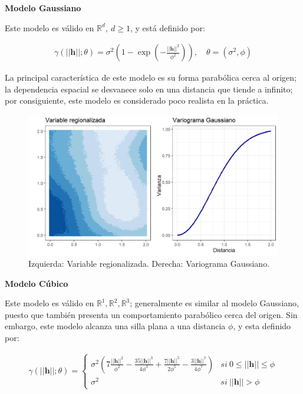\documentclass[
]{book}
\begin{document}
\textbf{Modelo Gaussiano}

Este modelo es válido en \(\mathbb{R}^d,\ d\geq 1\), y está definido por:

\begin{align}
    \gamma(||\textbf{h}||;\theta)=\sigma^2\left(1-\exp\left(-\frac{||\textbf{h}||^2}{\phi^2} \right) \right),\quad \theta=(\sigma^2,\phi)
\end{align}

La principal característica de este modelo es su forma parabólica cerca al origen; la dependencia espacial se desvanece solo en una distancia que tiende a infinito; por consiguiente, este modelo es considerado poco realista en la práctica.

\begin{figure}
\includegraphics[width=17.78in]{figuras/otros/gau_var} \caption{Izquierda: Variable regionalizada. Derecha: Variograma Gaussiano.}\label{fig:gauvar}
\end{figure}

\textbf{Modelo Cúbico}

Este modelo es válido en \(\mathbb{R}^1,\mathbb{R}^2,\mathbb{R}^3\); generalmente es similar al modelo Gaussiano, puesto que también presenta un comportamiento parabólico cerca del origen. Sin embargo, este modelo alcanza una silla plana a una distancia \(\phi\), y esta definido por:

\begin{align}
    \gamma(||\textbf{h}||;\theta)=\left \{ \begin{matrix} \sigma^2\left(7\frac{||\textbf{h}||^2}{\phi^2}-\frac{35||\textbf{h}||^3}{4\phi^3}+\frac{7||\textbf{h}||^5}{2\phi^5}-\frac{3||\textbf{h}||^7}{4\phi^7} \right) &  si \ 0\leq||\textbf{h}||\leq\phi\\
    \sigma^2 &  si\ ||\textbf{h}||>\phi \end{matrix}\right.
\end{align}
\end{document}
